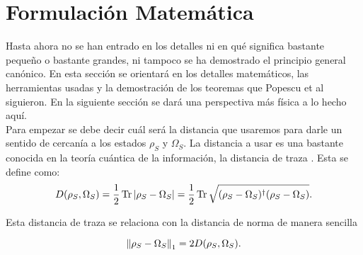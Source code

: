 \section{Formulación Matemática}

Hasta ahora no se han entrado en los detalles ni en qué significa bastante pequeño o bastante grandes, ni tampoco se ha demostrado el principio general canónico. En esta sección se orientará en los detalles matemáticos, las herramientas usadas y la demostración de los teoremas que Popescu et al siguieron. En la siguiente sección se dará una perspectiva más física a lo hecho aquí.
\\
Para empezar se debe decir cuál será la distancia que usaremos para darle un sentido de cercanía a los estados $\rho_{S}$ y $\Omega_{S}$. La distancia a usar es una bastante conocida en la teoría cuántica de la información, la distancia de traza \cite{NielsenInformation}. Esta se define como:
\begin{equation}
D(\rho_{S}, \Omega_{S})= \frac{1}{2} \Tr |\rho_{S} -\Omega_{S}|=\frac{1}{2} \Tr \sqrt{(\rho_{S} -\Omega_{S})^{\dag}(\rho_{S} -\Omega_{S})}.
\end{equation}

Esta distancia de traza se relaciona con la distancia de norma de manera sencilla

\begin{equation}
\norm{\rho_{S}-\Omega_{S}}_{1}=2 D(\rho_{S}, \Omega_{S}).
\end{equation}

